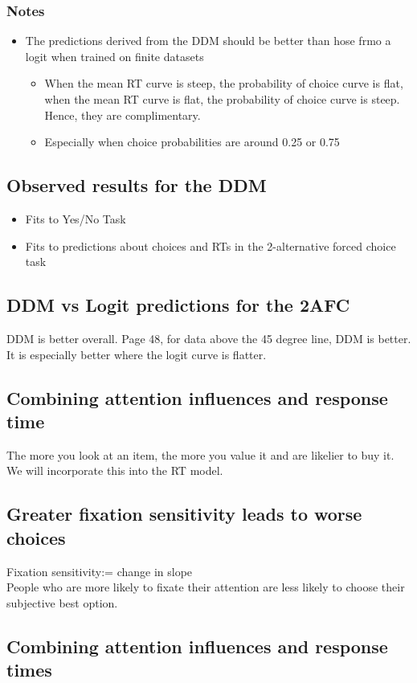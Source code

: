\subsubsection{Notes}
\begin{itemize}
    \item The predictions derived from the DDM should be better than hose frmo a logit when trained on finite datasets
    \begin{itemize}
    \item When the mean RT curve is steep, the probability of choice curve is flat, when the mean RT curve is flat, the probability of choice curve is steep. Hence, they are complimentary.
        \item Especially when choice probabilities are around 0.25 or 0.75
    \end{itemize}
\end{itemize}
\subsection{Observed results for the DDM}
\begin{itemize}
    \item Fits to Yes/No Task
    \item Fits to predictions about choices and RTs in the 2-alternative forced choice task
\end{itemize}
\subsection{DDM vs Logit predictions for the 2AFC}
DDM is better overall. Page 48, for data above the 45 degree line, DDM is better. It is especially better where the logit curve is flatter.
\subsection{Combining attention influences and response time}
The more you look at an item, the more you value it and are likelier to buy it. We will incorporate this into the RT model.
\subsection{Greater fixation sensitivity leads to worse choices}
Fixation sensitivity:= change in slope
\\People who are more likely to fixate their attention are less likely to choose their subjective best option.
\subsection{Combining attention influences and response times}
